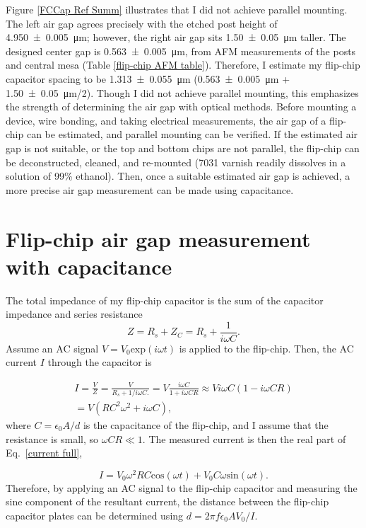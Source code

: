 \documentclass{beavtex_dub_edit}
\begin{document}
Figure \ref{FCCap Ref Summ} illustrates that I did not achieve parallel mounting. The left air gap agrees precisely with the etched post height of \SI{4.950(5)}{\micro\meter}; however, the right air gap sits \SI{1.50(5)}{\micro\meter} taller. The designed center gap is \SI{0.563(5)}{\micro\meter}, from AFM measurements of the posts and central mesa (Table \ref{flip-chip AFM table}). Therefore, I estimate my flip-chip capacitor spacing to be \SI{1.313(55)}{\micro\meter} (\SI{0.563(5)}{\micro\meter} + \SI{1.50(5)}{\micro\meter}/2). Though I did not achieve parallel mounting, this emphasizes the strength of determining the air gap with optical methods. Before mounting a device, wire bonding, and taking electrical measurements, the air gap of a flip-chip can be estimated, and parallel mounting can be verified. If the estimated air gap is not suitable, or the top and bottom chips are not parallel, the flip-chip can be deconstructed, cleaned, and re-mounted (7031 varnish readily dissolves in a solution of 99\% ethanol). Then, once a suitable estimated air gap is achieved, a more precise air gap measurement can be made using capacitance.


\section{Flip-chip air gap measurement with capacitance}
The total impedance of my flip-chip capacitor is the sum of the capacitor impedance and series resistance
\begin{equation}
    Z = R_s + Z_C = R_s + \frac{1}{i\omega C}.
\end{equation}
Assume an AC signal $V = V_0 \mathrm{exp}(i\omega t)$ is applied to the flip-chip. Then, the AC current $I$ through the capacitor is 

\begin{equation} \label{current full}
    \begin{split}
        I = \frac{V}{Z} = \frac{V}{R_s + 1/i\omega C.} = V \frac{i\omega C}{1 + i\omega C R}\approx V i\omega C (1 - i\omega C R) 
        \\ = V(R C^2 \omega ^2 + i\omega C),
    \end{split}
\end{equation}
where $C = \epsilon_0 A / d$ is the capacitance of the flip-chip, and I assume that the resistance is small, so $\omega C R \ll 1$. The measured current is then the real part of Eq.\ \ref{current full}, 

\begin{equation}
    I = V_0\omega^2 R C \mathrm{cos}(\omega t) + V_0 C \omega \mathrm{sin}(\omega t).
\end{equation}
Therefore, by applying an AC signal to the flip-chip capacitor and measuring the sine component of the resultant current, the distance between the flip-chip capacitor plates can be determined using $d = 2\pi f \epsilon_0 A V_0 / I$. 
\end{document}
